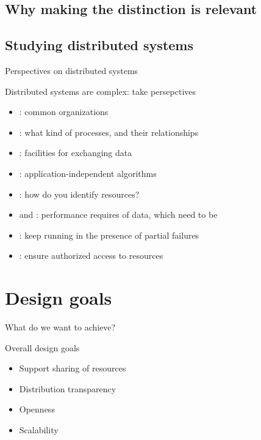 \subsection{Why making the distinction is relevant}
\subsection{Studying distributed systems}
\begin{slide}{Perspectives on distributed systems}
  \begin{block}{Distributed systems are complex: take persepctives}
    \begin{itemize}\firmlist
    \item {}: common organizations
    \item {}: what kind of processes, and their relationships
    \item {}: facilities for exchanging data
    \item {}: application-independent algorithms
    \item {}: how do you identify resources?
    \item {} and : performance requires of data, which need to be 
    \item {}: keep running in the presence of partial failures
    \item {}: ensure authorized access to resources
    \end{itemize}
  \end{block}
\end{slide}
\section{Design goals}
\begin{slide}{What do we want to achieve?}
  \begin{block}{Overall design goals}
    \begin{itemize}
    \item Support sharing of resources
    \item Distribution transparency
    \item Openness
    \item Scalability
    \end{itemize}
  \end{block}
\end{slide}
